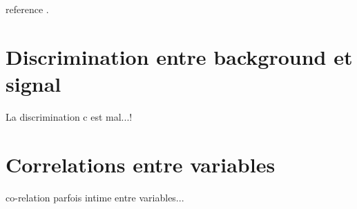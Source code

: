 \label{sec:unchapitre}

reference \cite{Cadambe2008}.

\section{Discrimination entre background et signal}

La discrimination c est mal...!

\section{Correlations entre variables}

co-relation parfois intime entre variables...

